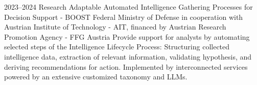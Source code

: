 \cventry
{2023--2024}
{Research}
{Adaptable Automated Intelligence Gathering Processes for Decision Support - BOOST}
{
  Federal Ministry of Defense
  in cooperation with Austrian Institute of Technology - AIT,
  financed by Austrian Research Promotion Agency - FFG}
{Austria}
{
  Provide support for analysts by automating selected steps of the Intelligence Lifecycle Process:
  Structuring collected intelligence data, extraction of relevant information, validating hypothesis,
  and deriving recommendations for action.
  Implemented by interconnected services powered by an extensive customized taxonomy and LLMs.
}

